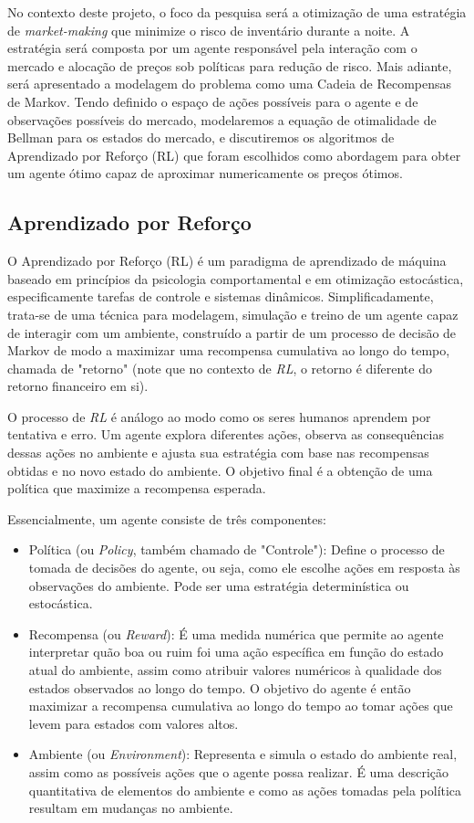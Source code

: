 No contexto deste projeto, o foco da pesquisa será a otimização de uma estratégia de \textit{market-making} que minimize o risco de inventário durante a noite. A estratégia será composta por um agente responsável pela interação com o mercado e alocação de preços sob políticas para redução de risco. Mais adiante, será apresentado a modelagem do problema como uma Cadeia de Recompensas de Markov. Tendo definido o espaço de ações possíveis para o agente e de observações possíveis do mercado, modelaremos a equação de otimalidade de Bellman para os estados do mercado, e discutiremos os algoritmos de Aprendizado por Reforço (RL) que foram escolhidos como abordagem para obter um agente ótimo capaz de aproximar numericamente os preços ótimos.

\subsection{Aprendizado por Reforço}
O Aprendizado por Reforço (RL) é um paradigma de aprendizado de máquina baseado em princípios da psicologia comportamental e em otimização estocástica, especificamente tarefas de controle e sistemas dinâmicos. Simplificadamente, trata-se de uma técnica para modelagem, simulação e treino de um agente capaz de interagir com um ambiente, construído a partir de um processo de decisão de Markov de modo a maximizar uma recompensa cumulativa ao longo do tempo, chamada de "retorno" (note que no contexto de \textit{RL}, o retorno é diferente do retorno financeiro em si).

O processo de \textit{RL} é análogo ao modo como os seres humanos aprendem por tentativa e erro. Um agente explora diferentes ações, observa as consequências dessas ações no ambiente e ajusta sua estratégia com base nas recompensas obtidas e no novo estado do ambiente. O objetivo final é a obtenção de uma política que maximize a recompensa esperada.

Essencialmente, um agente consiste de três componentes:

\begin{itemize}
\item Política (ou \textit{Policy}, também chamado de "Controle"): Define o processo de tomada de decisões do agente, ou seja, como ele escolhe ações em resposta às observações do ambiente. Pode ser uma estratégia determinística ou estocástica.

\item Recompensa (ou \textit{Reward}): É uma medida numérica que permite ao agente interpretar quão boa ou ruim foi uma ação específica em função do estado atual do ambiente, assim como atribuir valores numéricos à qualidade dos estados observados ao longo do tempo. O objetivo do agente é então maximizar a recompensa cumulativa ao longo do tempo ao tomar ações que levem para estados com valores altos.

\item Ambiente (ou \textit{Environment}): Representa e simula o estado do ambiente real, assim como as possíveis ações que o agente possa realizar. É uma descrição quantitativa de elementos do ambiente e como as ações tomadas pela política resultam em mudanças no ambiente.
\end{itemize}

